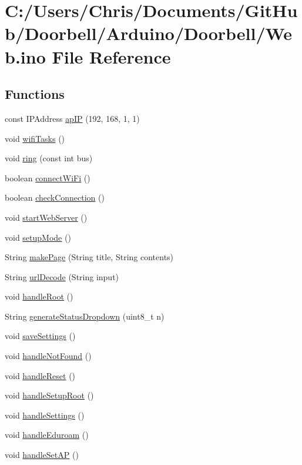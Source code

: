 \hypertarget{_web_8ino}{}\section{C\+:/\+Users/\+Chris/\+Documents/\+Git\+Hub/\+Doorbell/\+Arduino/\+Doorbell/\+Web.ino File Reference}
\label{_web_8ino}
\subsection*{Functions}
\begin{DoxyCompactItemize}
\item 
const I\+P\+Address \mbox{\hyperlink{_web_8ino_a5090b163ff08822a787a45da8b7ed87a}{ap\+IP}} (192, 168, 1, 1)
\item 
void \mbox{\hyperlink{_web_8ino_a6f6f044bce35a405bc05f223e20f8cf7}{wifi\+Tasks}} ()
\item 
void \mbox{\hyperlink{_web_8ino_a4b775e1d95473a982717aaa2da30e4f5}{ring}} (const int bus)
\item 
boolean \mbox{\hyperlink{_web_8ino_a144025702d7aa7708d704324ecb09eff}{connect\+Wi\+Fi}} ()
\item 
boolean \mbox{\hyperlink{_web_8ino_acec1ba9681e6777d66ed640286d203c7}{check\+Connection}} ()
\item 
void \mbox{\hyperlink{_web_8ino_a0d04c1af31c2cdcf510d08e8a6643fa9}{start\+Web\+Server}} ()
\item 
void \mbox{\hyperlink{_web_8ino_a292bc11fc3dcd09074ef62051f881173}{setup\+Mode}} ()
\item 
String \mbox{\hyperlink{_web_8ino_a18fa0b0ca8bd45d3e784a6fd2d888b7d}{make\+Page}} (String title, String contents)
\item 
String \mbox{\hyperlink{_web_8ino_a229909254c88e9d103199da59b22bdd0}{url\+Decode}} (String input)
\item 
void \mbox{\hyperlink{_web_8ino_a8427468f39342a1990703e9f5ce7fd29}{handle\+Root}} ()
\item 
String \mbox{\hyperlink{_web_8ino_a63f74e7b8412cefe754f74c174c0d024}{generate\+Status\+Dropdown}} (uint8\+\_\+t n)
\item 
void \mbox{\hyperlink{_web_8ino_ac7142ee2baa705d2dd402769467d5a4e}{save\+Settings}} ()
\item 
void \mbox{\hyperlink{_web_8ino_a54f2b176a577c7a89bb94da4f12cd06b}{handle\+Not\+Found}} ()
\item 
void \mbox{\hyperlink{_web_8ino_a28576d900afa7ce8f3f4177cb38f61b9}{handle\+Reset}} ()
\item 
void \mbox{\hyperlink{_web_8ino_a211179d239a3a6fdc1ba1b6d7df252ae}{handle\+Setup\+Root}} ()
\item 
void \mbox{\hyperlink{_web_8ino_af87f54300d1d09b658c30cff92a27f5b}{handle\+Settings}} ()
\item 
void \mbox{\hyperlink{_web_8ino_ac6b09eb8896b2e7975b32c3b4c82387b}{handle\+Eduroam}} ()
\item 
void \mbox{\hyperlink{_web_8ino_abc559dd4a64f6e15aff6bb8377de1e5c}{handle\+Set\+AP}} ()
\end{DoxyCompactItemize}
